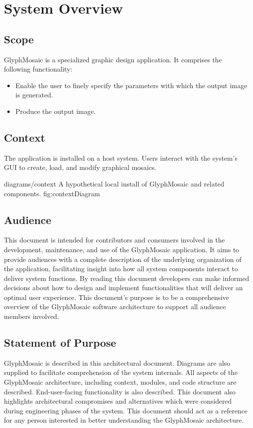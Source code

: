 \section{System Overview}
\subsection{Scope}
GlyphMosaic is a specialized graphic design application.
It comprises the following functionality:
\begin{itemize}
  \item Enable the user to finely specify the parameters with which the output image is generated.
  \item Produce the output image.
\end{itemize}


\subsection{Context}
The application is installed on a host system.
Users interact with the system's GUI to create, load, and modify graphical mosaics.

\sidiagram
{diagrams/context}
{A hypothetical local install of GlyphMosaic and related components.}
{fig:contextDiagram}
{\diagsize}


\subsection{Audience}
This document is intended for contributors and consumers involved in the development, maintenance, and use of the GlyphMosaic application.
It aims to provide audiences with a complete description of the underlying organization of the application, facilitating insight into how all system components interact to deliver system functions.
By reading this document developers can make informed decisions about how to design and implement functionalities that will deliver an optimal user experience.
This document's purpose is to be a comprehensive overview of the GlyphMosaic software architecture to support all audience members involved.


\subsection{Statement of Purpose}
GlyphMosaic is described in this architectural document.
Diagrams are also supplied to facilitate comprehension of the system internals.
All aspects of the GlyphMosaic architecture, including context, modules, and code structure are described.
End-user-facing functionality is also described.
This document also highlights architectural compromises and alternatives which were considered during engineering phases of the system.
This document should act as a reference for any person interested in better understanding the GlyphMosaic architecture.

